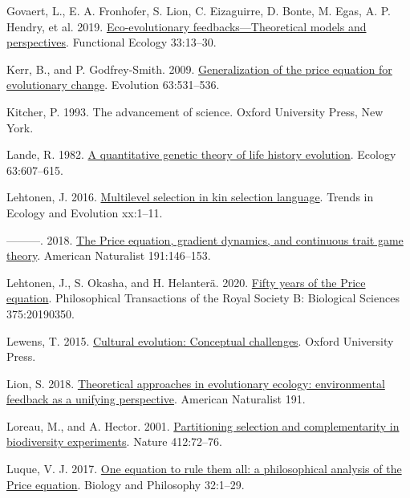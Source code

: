 \documentclass[
]{article}
\newlength{\cslhangindent}
\newenvironment{CSLReferences}[2] %
 {\begin{list}{}{%
  \setlength{\itemindent}{0pt}
  \setlength{\leftmargin}{0pt}
  \setlength{\parsep}{0pt}
  \ifodd #1
   \setlength{\leftmargin}{\cslhangindent}
   \setlength{\itemindent}{-1\cslhangindent}
  \fi
  \setlength{\itemsep}{#2\baselineskip}}}
 {\end{list}}
\begin{document}
\begin{CSLReferences}{0}{0}
Govaert, L., E. A. Fronhofer, S. Lion, C. Eizaguirre, D. Bonte, M. Egas,
A. P. Hendry, et al. 2019.
\href{https://doi.org/10.1111/1365-2435.13241}{{Eco-evolutionary
feedbacks---Theoretical models and perspectives}}. Functional Ecology
33:13--30.

Kerr, B., and P. Godfrey-Smith. 2009.
\href{https://doi.org/10.1111/j.1558-5646.2008.00570.x}{{Generalization
of the price equation for evolutionary change}}. Evolution 63:531--536.

Kitcher, P. 1993. {The advancement of science}. Oxford University Press,
New York.

Lande, R. 1982. \href{https://doi.org/10.2307/1936778}{{A quantitative
genetic theory of life history evolution}}. Ecology 63:607--615.

Lehtonen, J. 2016.
\href{https://doi.org/10.1016/j.tree.2016.07.006}{{Multilevel selection
in kin selection language}}. Trends in Ecology and Evolution xx:1--11.

---------. 2018. \href{https://doi.org/10.1086/694891}{{The Price
equation, gradient dynamics, and continuous trait game theory}}.
American Naturalist 191:146--153.

Lehtonen, J., S. Okasha, and H. Helanterä. 2020.
\href{https://doi.org/10.1098/rstb.2019.0350}{{Fifty years of the Price
equation}}. Philosophical Transactions of the Royal Society B:
Biological Sciences 375:20190350.

Lewens, T. 2015.
\href{https://doi.org/10.1093/acprof:oso/9780199674183.001.0001}{Cultural
evolution: Conceptual challenges}. Oxford University Press.

Lion, S. 2018. \href{https://doi.org/10.1086/694865}{{Theoretical
approaches in evolutionary ecology: environmental feedback as a unifying
perspective}}. American Naturalist 191.

Loreau, M., and A. Hector. 2001.
\href{https://doi.org/10.1038/35083573}{{Partitioning selection and
complementarity in biodiversity experiments}}. Nature 412:72--76.

Luque, V. J. 2017. \href{https://doi.org/10.1007/s10539-016-9538-y}{{One
equation to rule them all: a philosophical analysis of the Price
equation}}. Biology and Philosophy 32:1--29.


\end{CSLReferences}
\end{document}
